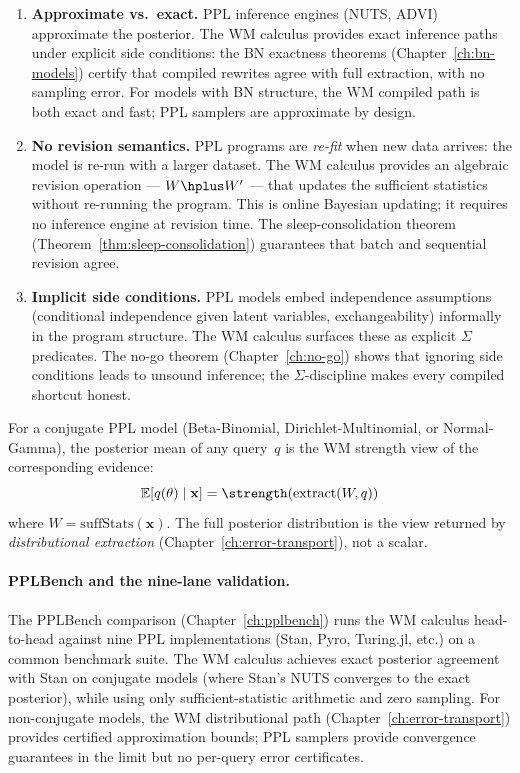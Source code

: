 \begin{enumerate}
\item \textbf{Approximate vs.\ exact.}  PPL inference engines
  (NUTS, ADVI) approximate the posterior.  The WM calculus provides
  exact inference paths under explicit side conditions: the BN
  exactness theorems (Chapter~\ref{ch:bn-models}) certify that
  compiled rewrites agree with full extraction, with no sampling
  error.  For models with BN structure, the WM compiled path is
  both exact and fast; PPL samplers are approximate by design.

\item \textbf{No revision semantics.}  PPL programs are
  \emph{re-fit} when new data arrives: the model is re-run with a
  larger dataset.  The WM calculus provides an algebraic revision
  operation --- $W \hplus W'$ --- that updates the sufficient
  statistics without re-running the program.  This is online
  Bayesian updating; it requires no inference engine at
  revision time.  The sleep-consolidation theorem
  (Theorem~\ref{thm:sleep-consolidation}) guarantees that batch and
  sequential revision agree.

\item \textbf{Implicit side conditions.}  PPL models embed
  independence assumptions (conditional independence given latent
  variables, exchangeability) informally in the program structure.
  The WM calculus surfaces these as explicit $\Sigma$ predicates.
  The no-go theorem (Chapter~\ref{ch:no-go}) shows that ignoring
  side conditions leads to unsound inference; the $\Sigma$-discipline
  makes every compiled shortcut honest.
\end{enumerate}

\begin{proposition}
\label{prop:ppl-strength-view}
For a conjugate PPL model (Beta-Binomial, Dirichlet-Multinomial, or
Normal-Gamma), the posterior mean of any query~$q$ is the WM strength
view of the corresponding evidence:
\[
  \mathbb{E}[q(\theta) \mid \mathbf{x}] =
  \strength(\mathrm{extract}(W, q))
\]
where $W = \mathrm{suffStats}(\mathbf{x})$.  The full posterior
distribution is the view returned by \emph{distributional extraction}
(Chapter~\ref{ch:error-transport}), not a scalar.
\end{proposition}

\paragraph{PPLBench and the nine-lane validation.}
The PPLBench comparison (Chapter~\ref{ch:pplbench}) runs the WM
calculus head-to-head against nine PPL implementations (Stan, Pyro,
Turing.jl, etc.) on a common benchmark suite.  The WM calculus
achieves exact posterior agreement with Stan on conjugate models
(where Stan's NUTS converges to the exact posterior), while using
only sufficient-statistic arithmetic and zero sampling.  For
non-conjugate models, the WM distributional path
(Chapter~\ref{ch:error-transport}) provides certified approximation
bounds; PPL samplers provide convergence guarantees in the limit
but no per-query error certificates.


